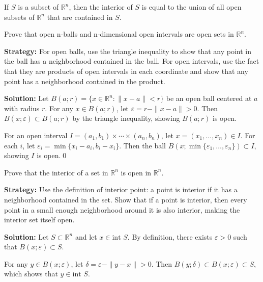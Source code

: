 \begin{theorem}
If $S$ is a subset of $\mathbb{R}^n$, then the interior of $S$ is equal to the union of all open subsets of $\mathbb{R}^n$ that are contained in $S$.
\end{theorem}



\begin{problembox}
Prove that open n-balls and n-dimensional open intervals are open sets in $\mathbb{R}^n$.
\end{problembox}

\noindent\textbf{Strategy:} For open balls, use the triangle inequality to show that any point in the ball has a neighborhood contained in the ball. For open intervals, use the fact that they are products of open intervals in each coordinate and show that any point has a neighborhood contained in the product.

\bigskip\noindent\textbf{Solution:} Let $B(a;r) = \{x \in \mathbb{R}^n : \|x-a\| < r\}$ be an open ball centered at $a$ with radius $r$. For any $x \in B(a;r)$, let $\varepsilon = r - \|x-a\| > 0$. Then $B(x;\varepsilon) \subset B(a;r)$ by the triangle inequality, showing $B(a;r)$ is open.

For an open interval $I = (a_1,b_1) \times \cdots \times (a_n,b_n)$, let $x = (x_1,\ldots,x_n) \in I$. For each $i$, let $\varepsilon_i = \min\{x_i - a_i, b_i - x_i\}$. Then the ball $B(x;\min\{\varepsilon_1,\ldots,\varepsilon_n\}) \subset I$, showing $I$ is open.\qed


\begin{problembox}
Prove that the interior of a set in $\mathbb{R}^n$ is open in $\mathbb{R}^n$.
\end{problembox}

\noindent\textbf{Strategy:} Use the definition of interior point: a point is interior if it has a neighborhood contained in the set. Show that if a point is interior, then every point in a small enough neighborhood around it is also interior, making the interior set itself open.

\bigskip\noindent\textbf{Solution:} Let $S \subset \mathbb{R}^n$ and let $x \in \text{int } S$. By definition, there exists $\varepsilon > 0$ such that $B(x;\varepsilon) \subset S$.

For any $y \in B(x;\varepsilon)$, let $\delta = \varepsilon - \|y-x\| > 0$. Then $B(y;\delta) \subset B(x;\varepsilon) \subset S$, which shows that $y \in \text{int } S$.

